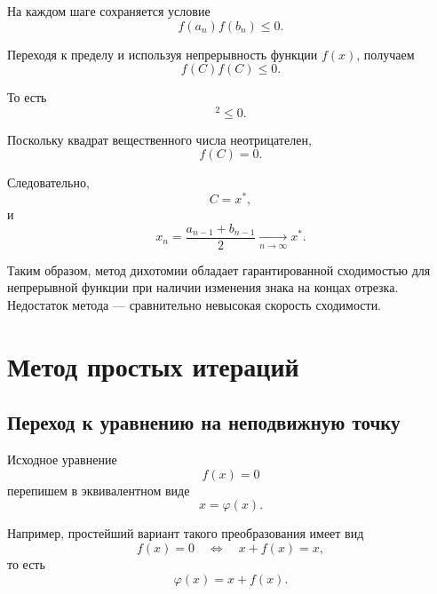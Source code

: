 \documentclass[../final.tex]{subfiles}
\begin{document}
На каждом шаге сохраняется условие
%
\begin{equation*}
    f(a_n)f(b_n)\leq0.
\end{equation*}

Переходя к пределу и используя непрерывность функции $f(x)$,
получаем
%
\begin{equation*}
    f(C)f(C)\leq0.
\end{equation*}

То есть
%
\begin{equation*}
    [f(C)]^2\leq0.
\end{equation*}

Поскольку квадрат вещественного числа неотрицателен,
%
\begin{equation*}
    f(C)=0.
\end{equation*}

Следовательно,
%
\begin{equation*}
    C=x^*,
\end{equation*}
%
и
%
\begin{equation*}
    x_n
    =
    \frac{a_{n-1}+b_{n-1}}{2}
    \underset{n\to\infty}{\longrightarrow}
    x^*.
\end{equation*}

Таким образом, метод дихотомии обладает гарантированной сходимостью
для непрерывной функции при наличии изменения знака на концах
отрезка. Недостаток метода --- сравнительно невысокая скорость
сходимости.


\section{Метод простых итераций}

\subsection{Переход к уравнению на неподвижную точку}

Исходное уравнение
%
\begin{equation*}
    f(x)=0
\end{equation*}
%
перепишем в эквивалентном виде
%
\begin{equation*}
    x=\varphi(x).
\end{equation*}

Например, простейший вариант такого преобразования имеет вид
%
\begin{equation*}
    f(x)=0
    \quad\Longleftrightarrow\quad
    x+f(x)=x,
\end{equation*}
%
то есть
%
\begin{equation*}
    \varphi(x)=x+f(x).
\end{equation*}
\end{document}

